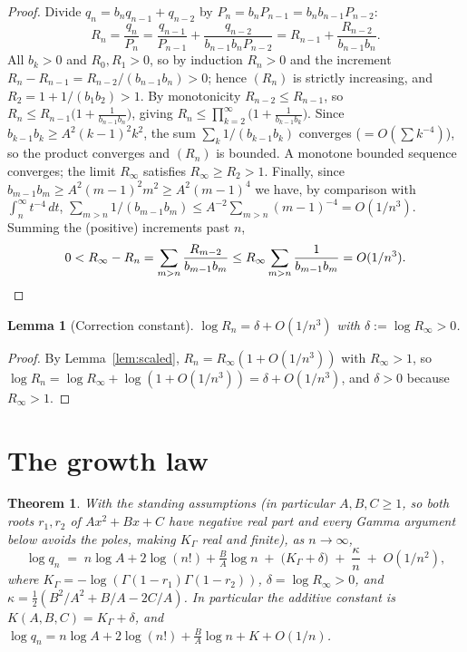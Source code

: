 \documentclass[11pt]{article}
\newtheorem{theorem}{Theorem}
\newtheorem{lemma}{Lemma}
\begin{document}
\begin{proof}
Divide $q_n=b_nq_{n-1}+q_{n-2}$ by $P_n=b_nP_{n-1}=b_nb_{n-1}P_{n-2}$:
\[
  R_n=\frac{q_n}{P_n}
     =\frac{q_{n-1}}{P_{n-1}}+\frac{q_{n-2}}{b_{n-1}b_nP_{n-2}}
     =R_{n-1}+\frac{R_{n-2}}{b_{n-1}b_n}.
\]
All $b_k>0$ and $R_0,R_1>0$, so by induction $R_n>0$ and the increment
$R_n-R_{n-1}=R_{n-2}/(b_{n-1}b_n)>0$; hence $(R_n)$ is strictly increasing, and
$R_2=1+1/(b_1b_2)>1$. By monotonicity $R_{n-2}\le R_{n-1}$, so
$R_n\le R_{n-1}\big(1+\tfrac{1}{b_{n-1}b_n}\big)$, giving
$R_n\le\prod_{k=2}^\infty\big(1+\tfrac{1}{b_{k-1}b_k}\big)$. Since
$b_{k-1}b_k\ge A^2(k-1)^2k^2$, the sum $\sum_k 1/(b_{k-1}b_k)$ converges
($=O(\sum k^{-4})$), so the product converges and $(R_n)$ is bounded. A monotone
bounded sequence converges; the limit $R_\infty$ satisfies $R_\infty\ge R_2>1$.
Finally, since $b_{m-1}b_m\ge A^2(m-1)^2m^2\ge A^2(m-1)^4$ we have, by comparison
with $\int_n^\infty t^{-4}\,dt$,
$\sum_{m>n}1/(b_{m-1}b_m)\le A^{-2}\sum_{m>n}(m-1)^{-4}=O(1/n^3)$. Summing the
(positive) increments past $n$,
\[
  0<R_\infty-R_n=\sum_{m>n}\frac{R_{m-2}}{b_{m-1}b_m}
     \le R_\infty\sum_{m>n}\frac{1}{b_{m-1}b_m}=O(1/n^3).\qedhere
\]
\end{proof}

\begin{lemma}[Correction constant]\label{lem:delta}
$\log R_n=\delta+O(1/n^3)$ with $\delta:=\log R_\infty>0$.
\end{lemma}

\begin{proof}
By Lemma~\ref{lem:scaled}, $R_n=R_\infty(1+O(1/n^3))$ with $R_\infty>1$, so
$\log R_n=\log R_\infty+\log(1+O(1/n^3))=\delta+O(1/n^3)$, and $\delta>0$ because
$R_\infty>1$.
\end{proof}

\section{The growth law}

\begin{theorem}\label{thm:main}
With the standing assumptions (in particular $A,B,C\ge1$, so both roots
$r_1,r_2$ of $Ax^2+Bx+C$ have negative real part and every Gamma argument below
avoids the poles, making $K_\Gamma$ real and finite), as $n\to\infty$,
\[
  \log q_n \;=\; n\log A + 2\log(n!) + \tfrac{B}{A}\log n
            \;+\; \big(K_\Gamma+\delta\big) \;+\; \frac{\kappa}{n} \;+\; O(1/n^2),
\]
where $K_\Gamma=-\log(\Gamma(1-r_1)\Gamma(1-r_2))$, $\delta=\log R_\infty>0$, and
$\kappa=\tfrac12(B^2/A^2+B/A-2C/A)$. In particular the additive constant is
$K(A,B,C)=K_\Gamma+\delta$, and
$\log q_n=n\log A+2\log(n!)+\tfrac{B}{A}\log n+K+O(1/n)$.
\end{theorem}
\end{document}
